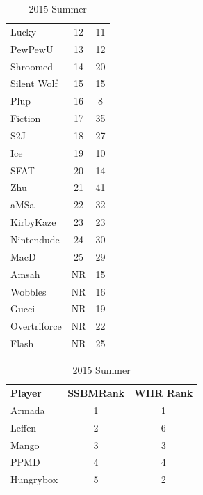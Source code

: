 \documentclass[10pt]{article}
\theoremstyle{definition}
\theoremstyle{remark}
\begin{document}
\begin{table}[!ht]
{\begin{tabular}{lcc}
    Lucky           & 12                     & 11       \\
    PewPewU         & 13                     & 12       \\
    Shroomed        & 14                     & 20       \\
    Silent Wolf     & 15                     & 15       \\
    Plup            & 16                     & 8        \\
    Fiction         & 17                     & 35       \\
    S2J             & 18                     & 27       \\
    Ice             & 19                     & 10       \\
    SFAT            & 20                     & 14       \\
    Zhu             & 21                     & 41       \\
    aMSa            & 22                     & 32       \\
    KirbyKaze       & 23                     & 23       \\
    Nintendude      & 24                     & 30       \\
    MacD            & 25                     & 29       \\
    Amsah           & NR                     & 15       \\
    Wobbles         & NR                     & 16       \\
    Gucci           & NR                     & 19       \\
    Overtriforce    & NR                     & 22       \\
    Flash           & NR                     & 25       \\
\end{tabular}
}
    \parbox{.35 \textwidth}{
        \centering
    \caption{2015 Summer}
\begin{tabular}{lcc}
    \textbf{Player} & \textbf{SSBMRank} & \textbf{WHR Rank} \\
    Armada          & 1                      & 1        \\
    Leffen          & 2                      & 6        \\
    Mango           & 3                      & 3        \\
    PPMD            & 4                      & 4        \\
    Hungrybox       & 5                      & 2        \\

\end{tabular}}
\end{table}
\end{document}
